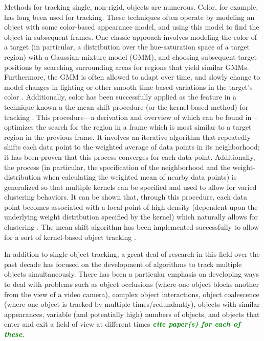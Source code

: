 \documentclass[smallcondensed, final]{svjour3}
\newcommand{\willie}[1]{\textcolor{green}{\textsf{\emph{\textbf{\textcolor{green}{#1}}}}}}
\begin{document}
Methods for tracking single, non-rigid, objects are numerous. Color, for example, has long been used for tracking. These techniques often operate by modeling an object with some color-based appearance model, and using this model to find the object in subsequent frames. One classic approach involves modeling the color of a target (in particular, a distribution over the hue-saturation space of a target region) with a Gaussian mixture model (GMM), and choosing subsequent target positions by searching surrounding areas for regions that yield similar GMMs. Furthermore, the GMM is often allowed to adapt over time, and slowly change to model changes in lighting or other smooth time-based variations in the target's color \citep{raja_1998, mckenna_1999, jepson_2003}. Additionally, color has been successfully applied as the feature in a technique known a the mean-shift procedure (or the kernel-based method) for tracking \citep{comaniciu_2003, perez_2002, nummiaro_2003, lee_2011}. This procedure---a derivation and overview of which can be found in \citep{fukunaga_1975, cheng_1995}--optimizes the search for the region in a frame which is most similar to a target region in the previous frame. It involves an iterative algorithm that repeatedly shifts each data point to the weighted average of data points in its neighborhood; it has been proven that this process converges for each data point. Additionally, the process (in particular, the specification of the neighborhood and the weight-distribution when calculating the weighted mean of nearby data points) is generalized so that multiple kernels can be specified and used to allow for varied clustering behaviors. It can be shown that, through this procedure, each data point becomes associated with a local point of high density (dependent upon the underlying weight distribution specified by the kernel) which naturally allows for clustering \citep{cheng_1995}. The mean shift algorithm has been implemented successfully to allow for a sort of kernel-based object tracking \citep{comaniciu_2003, comaniciu_1999, comaniciu_2000}.

In addition to single object tracking, a great deal of research in this field over the past decade has focused on the development of algorithms to track multiple objects simultaneously. There has been a particular emphasis on developing ways to deal with problems such as object occlusions (where one object blocks another from the view of a video camera), complex object interactions, object coalescence (where one object is tracked by multiple times/redundantly), objects with similar appearances, variable (and potentially high) numbers of objects, and objects that enter and exit a field of view at different times \willie{cite paper(s) for each of these}.
\end{document}
